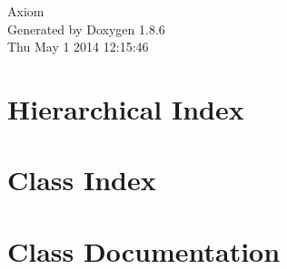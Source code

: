 \documentclass[twoside]{book}
\newcommand{\clearemptydoublepage}{%
  \newpage{\pagestyle{empty}\cleardoublepage}%
}
\begin{document}
\hypersetup{pageanchor=false}
\begin{titlepage}
\vspace*{7cm}
\begin{center}%
{\Large Axiom }\\
\vspace*{1cm}
{\large Generated by Doxygen 1.8.6}\\
\vspace*{0.5cm}
{\small Thu May 1 2014 12:15:46}\\
\end{center}
\end{titlepage}
\clearemptydoublepage
\tableofcontents
\clearemptydoublepage
{}
\hypersetup{pageanchor=true}

\chapter{Hierarchical Index}

\chapter{Class Index}

\chapter{Class Documentation}












































\newpage
{}
{}
\printindex
\end{document}
